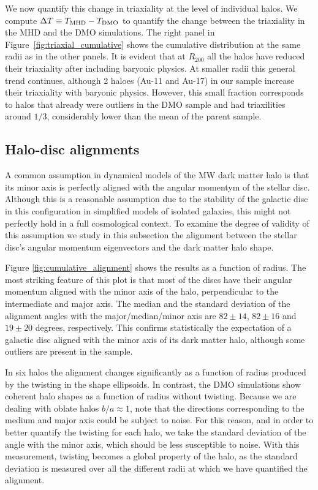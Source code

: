 \documentclass[usenatbib]{mnras}
\begin{document}
We now quantify this change in triaxiality at the level of individual halos.
We compute $\Delta T\equiv T_{\rm MHD}-T_{\rm DMO}$ to quantify the
change between the triaxiality in the MHD and the DMO simulations.
The right panel in Figure~\ref{fig:triaxial_cumulative} shows
the cumulative distribution at the same radii as in the other panels.
It is evident that at $R_{200}$ all the halos have
reduced their triaxiality after including baryonic physics.
At smaller radii this general trend continues, although 2 haloes
(Au-11 and Au-17)  in our sample increase their triaxiality with baryonic physics. 
However, this small fraction corresponds to halos that already were
outliers in the DMO sample and had triaxilities around $1/3$,
considerably lower than the mean of the parent sample.


\subsection{Halo-disc alignments}

A common assumption in dynamical models of the MW dark matter halo is that
its minor axis is perfectly aligned with the angular momentym of the
stellar disc. 
Although this is a reasonable assumption due to the stability of
the galactic disc in this configuration in simplified models of isolated galaxies, this
might not perfectly hold in a full cosmological context. 
To examine the degree of validity of this assumption we study in this
subsection the alignment between the stellar disc's angular momentum
eigenvectors and the dark matter halo shape.

Figure \ref{fig:cumulative_alignment} shows the
results as a function of radius.
The most striking feature of this plot is that most of the discs have
their angular momentum aligned with the minor axis of the halo,
perpendicular to the intermediate and major axis. 
The median and the standard deviation of the alignment angles with
the major/median/minor axis are $82\pm14$, $82\pm16$ and $19\pm20$
degrees, respectively.
This confirms statistically the expectation of a galactic disc aligned
with the minor axis of its dark matter halo, although some outliers
are present in the sample.

In six halos the alignment changes significantly as a
function of radius produced by the twisting in the shape ellipsoids. 
In contrast, the DMO simulations show coherent halo shapes as a
function of radius without twisting. 
Because we are dealing with oblate halos $b/a\approx 1$, note that the
directions corresponding to the medium and major axis could be subject
to noise. 
For this reason, and in order to better quantify the twisting for each
halo, we take the standard deviation of the angle with the minor
axis, which should be less susceptible to noise.
With this measurement, twisting becomes a global property of the halo,
as the standard deviation is measured over all the different radii at
which we have quantified the alignment.
\end{document}
